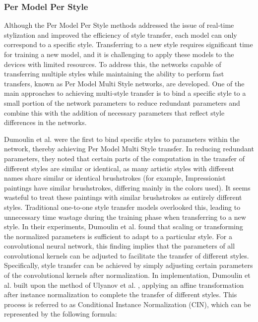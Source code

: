 \subsubsection{Per Model Per Style}

Although the Per Model Per Style methods addressed the issue of real-time stylization and improved the efficiency of style transfer, each model can only correspond to a specific style. Transferring to a new style requires significant time for training a new model, and it is challenging to apply these models to the devices with limited resources. To address this, the networks capable of transferring multiple styles while maintaining the ability to perform fast transfers, known as Per Model Multi Style networks, are developed. One of the main approaches to achieving multi-style transfer is to bind a specific style to a small portion of the network parameters to reduce redundant parameters and combine this with the addition of necessary parameters that reflect style differences in the networks.

Dumoulin et al.\citep{39dumoulin2016learned} were the first to bind specific styles to parameters within the network, thereby achieving Per Model Multi Style transfer. In reducing redundant parameters, they noted that certain parts of the computation in the transfer of different styles are similar or identical, as many artistic styles with different names share similar or identical brushstrokes (for example, Impressionist paintings have similar brushstrokes, differing mainly in the colors used). It seems wasteful to treat these paintings with similar brushstrokes as entirely different styles. Traditional one-to-one style transfer models overlooked this, leading to unnecessary time wastage during the training phase when transferring to a new style.
In their experiments, Dumoulin et al.\citep{39dumoulin2016learned} found that scaling or transforming the normalized parameters is sufficient to adapt to a particular style. For a convolutional neural network, this finding implies that the parameters of all convolutional kernels can be adjusted to facilitate the transfer of different styles. Specifically, style transfer can be achieved by simply adjusting certain parameters of the convolutional kernels after normalization. In implementation, Dumoulin et al.\citep{39dumoulin2016learned} built upon the method of Ulyanov et al. \citep{23ulyanov2016texture}, applying an affine transformation after instance normalization to complete the transfer of different styles. This process is referred to as Conditional Instance Normalization (CIN), which can be represented by the following formula:

